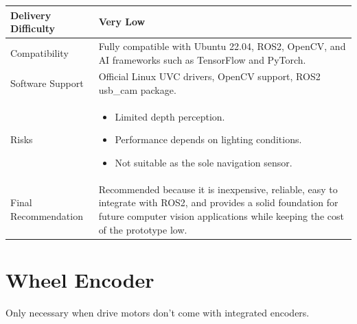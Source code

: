 \documentclass[12pt,a4paper]{article}
\begin{document}
\begin{longtable}{|p{4cm}|p{10cm}|}
Delivery Difficulty &
Very Low \\
\hline

Compatibility &
Fully compatible with Ubuntu 22.04, ROS2, OpenCV, and AI frameworks such as TensorFlow and PyTorch. \\
\hline

Software Support &
Official Linux UVC drivers, OpenCV support, ROS2 usb\_cam package. \\
\hline

Risks &
\begin{itemize}
\item Limited depth perception.
\item Performance depends on lighting conditions.
\item Not suitable as the sole navigation sensor.
\end{itemize}
\\
\hline

Final Recommendation &
Recommended because it is inexpensive, reliable, easy to integrate with ROS2, and provides a solid foundation for future computer vision applications while keeping the cost of the prototype low.
\\
\hline

\end{longtable}

\section{Wheel Encoder}
Only necessary when drive motors don't come with integrated encoders.
\end{document}
